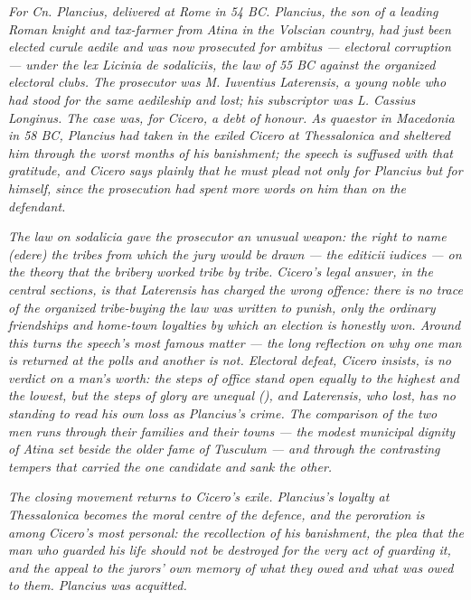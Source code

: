 
\textit{For Cn. Plancius, delivered at Rome in 54 BC.
Plancius, the son of a leading Roman knight and
tax-farmer from Atina in the Volscian country, had just
been elected curule aedile and was now prosecuted for
ambitus --- electoral corruption --- under the lex
Licinia de sodaliciis, the law of 55 BC against the
organized electoral clubs. The prosecutor was M.
Iuventius Laterensis, a young noble who had stood for
the same aedileship and lost; his subscriptor was L.
Cassius Longinus. The case was, for Cicero, a debt of
honour. As quaestor in Macedonia in 58 BC, Plancius had
taken in the exiled Cicero at Thessalonica and sheltered
him through the worst months of his banishment; the
speech is suffused with that gratitude, and Cicero says
plainly that he must plead not only for Plancius but
for himself, since the prosecution had spent more words
on him than on the defendant.}

\textit{The law on sodalicia gave the prosecutor an
unusual weapon: the right to name (\textit{edere}) the
tribes from which the jury would be drawn --- the
\textit{editicii iudices} --- on the theory that the
bribery worked tribe by tribe. Cicero's legal answer,
in the central sections, is that Laterensis has charged
the wrong offence: there is no trace of the organized
tribe-buying the law was written to punish, only the
ordinary friendships and home-town loyalties by which an
election is honestly won. Around this turns the speech's
most famous matter --- the long reflection on why one
man is returned at the polls and another is not.
Electoral defeat, Cicero insists, is no verdict on a
man's worth: the steps of office stand open equally to
the highest and the lowest, but the steps of glory are
unequal (), and Laterensis, who lost,
has no standing to read his own loss as Plancius's
crime. The comparison of the two men runs through their
families and their towns --- the modest municipal
dignity of Atina set beside the older fame of Tusculum
--- and through the contrasting tempers that carried the
one candidate and sank the other.}

\textit{The closing movement returns to Cicero's exile.
Plancius's loyalty at Thessalonica becomes the moral
centre of the defence, and the peroration is among
Cicero's most personal: the recollection of his
banishment, the plea that the man who guarded his life
should not be destroyed for the very act of guarding it,
and the appeal to the jurors' own memory of what they
owed and what was owed to them. Plancius was acquitted.}
